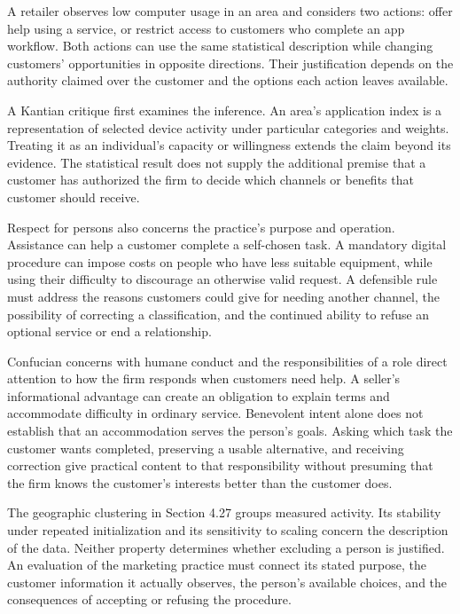 \noindent \noindent A retailer observes low computer usage in an area and
considers two actions: offer help using a service, or restrict access to
customers who complete an app workflow. Both actions can use the same
statistical description while changing customers' opportunities in
opposite directions. Their justification depends on the authority
claimed over the customer and the options each action leaves available.

A Kantian critique first examines the inference. An area's application
index is a representation of selected device activity under particular
categories and weights. Treating it as an individual's capacity or
willingness extends the claim beyond its evidence. The statistical
result does not supply the additional premise that a customer has
authorized the firm to decide which channels or benefits that customer
should receive.

Respect for persons also concerns the practice's purpose and operation.
Assistance can help a customer complete a self-chosen task. A mandatory
digital procedure can impose costs on people who have less suitable
equipment, while using their difficulty to discourage an otherwise valid
request. A defensible rule must address the reasons customers could give
for needing another channel, the possibility of correcting a
classification, and the continued ability to refuse an optional service
or end a relationship.

Confucian concerns with humane conduct and the responsibilities of a
role direct attention to how the firm responds when customers need help.
A seller's informational advantage can create an obligation to explain
terms and accommodate difficulty in ordinary service. Benevolent intent
alone does not establish that an accommodation serves the person's
goals. Asking which task the customer wants completed, preserving a
usable alternative, and receiving correction give practical content to
that responsibility without presuming that the firm knows the customer's
interests better than the customer does.

The geographic clustering in Section 4.27 groups measured activity. Its
stability under repeated initialization and its sensitivity to scaling
concern the description of the data. Neither property determines whether
excluding a person is justified. An evaluation of the marketing practice
must connect its stated purpose, the customer information it actually
observes, the person's available choices, and the consequences of
accepting or refusing the procedure.

